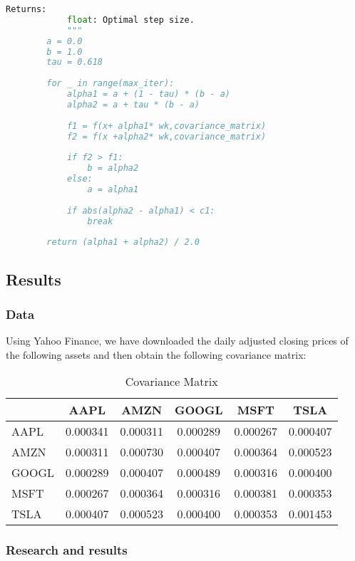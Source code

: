 \documentclass[12pt]{article}
\begin{document}
\begin{lstlisting}[language=Python]
            Returns:
            float: Optimal step size.
            """
        a = 0.0
        b = 1.0
        tau = 0.618
    
        for _ in range(max_iter):
            alpha1 = a + (1 - tau) * (b - a)
            alpha2 = a + tau * (b - a)
    
            f1 = f(x+ alpha1* wk,covariance_matrix)
            f2 = f(x +alpha2* wk,covariance_matrix)
    
            if f2 > f1:
                b = alpha2
            else:
                a = alpha1
    
            if abs(alpha2 - alpha1) < c1:
                break
    
        return (alpha1 + alpha2) / 2.0

\end{lstlisting}

\subsection*{Results}

\subsubsection*{Data}

Using Yahoo Finance, we have downloaded the daily adjusted closing prices of the following assets and then obtain the following covariance matrix:

\begin{table}[h]
    \centering
    \begin{tabular}{l|ccccc}
          & AAPL   & AMZN   & GOOGL  & MSFT   & TSLA   \\
    \hline
    AAPL  & 0.000341 & 0.000311 & 0.000289 & 0.000267 & 0.000407 \\
    AMZN  & 0.000311 & 0.000730 & 0.000407 & 0.000364 & 0.000523 \\
    GOOGL & 0.000289 & 0.000407 & 0.000489 & 0.000316 & 0.000400 \\
    MSFT  & 0.000267 & 0.000364 & 0.000316 & 0.000381 & 0.000353 \\
    TSLA  & 0.000407 & 0.000523 & 0.000400 & 0.000353 & 0.001453 \\
    \end{tabular}
    \caption{Covariance Matrix}
    \label{tab:covariance_matrix}
\end{table}



\subsubsection*{Research and results}
\end{document}
